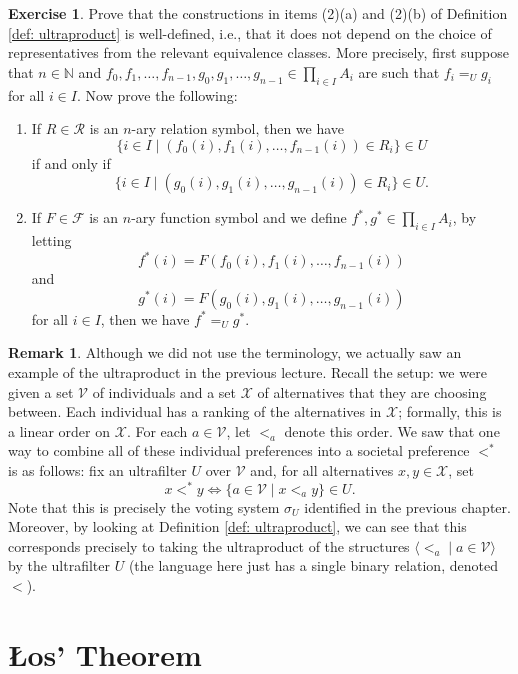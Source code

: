\documentclass[a4paper]{memoir}
\theoremstyle{definition}
\newtheorem{remark}[theorem]{Remark}
\newtheorem{exercise}[theorem]{Exercise}
\newcommand{\bb}{\mathbb}
\newcommand{\mc}{\mathcal}
\begin{document}
\begin{exercise}
  Prove that the constructions in items (2)(a) and (2)(b) of Definition \ref{def: ultraproduct} is 
  well-defined, i.e., that it does not depend on the choice of representatives from the relevant 
  equivalence classes. More precisely, first suppose that $n \in \bb{N}$ and 
  $f_0, f_1, \ldots, f_{n-1}, g_0, g_1, \ldots, g_{n-1} \in \prod_{i \in I} A_i$ are such that 
  $f_i =_U g_i$ for all $i \in I$. Now prove the following:
  \begin{enumerate}
    \item If $R \in \mc{R}$ is an $n$-ary relation symbol, then we have 
    \[
      \{ i \in I \mid (f_0(i), f_1(i), \ldots, f_{n-1}(i)) \in R_i\} \in U
    \]
    if and only if
    \[
      \{i \in I \mid (g_0(i), g_1(i), \ldots, g_{n-1}(i)) \in R_i\} \in U.
    \]
    \item If $F \in \mc{F}$ is an $n$-ary function symbol and we define $f^*, g^* \in \prod_{i \in I} 
    A_i$, by letting 
    \[
      f^*(i) = F(f_0(i), f_1(i), \ldots, f_{n-1}(i))
    \]
    and 
    \[
      g^*(i) = F(g_0(i), g_1(i), \ldots, g_{n-1}(i))
    \]
    for all $i \in I$, then we have $f^* =_U g^*$.
  \end{enumerate}
\end{exercise}

\begin{remark}
Although we did not use the terminology, we actually saw an example of the ultraproduct in 
the previous lecture. Recall the setup: we were given a set $\mc{V}$ of individuals and a set 
$\mc{X}$ of alternatives that they are choosing between. Each individual has a ranking of 
the alternatives in $\mc{X}$; formally, this is a linear order on $\mc{X}$. For each 
$a \in \mc{V}$, let $<_a$ denote this order. We saw that one way to combine all of these 
individual preferences into a societal preference $<^*$ is as follows: fix an ultrafilter 
$U$ over $\mc{V}$ and, for all alternatives $x,y \in \mc{X}$, set 
\[
  x <^* y \Longleftrightarrow \{a \in \mc{V} \mid x <_a y\} \in U.
\]
Note that this is precisely the voting system $\sigma_U$ identified in the previous chapter. 
Moreover, by looking at Definition \ref{def: ultraproduct}, we can see that this corresponds 
precisely to taking the ultraproduct of the structures $\langle <_a \mid a \in \mc{V} \rangle$ 
by the ultrafilter $U$ (the language here just has a single binary relation, denoted $<$).
\end{remark}

\section{\L os' Theorem}
\end{document}
